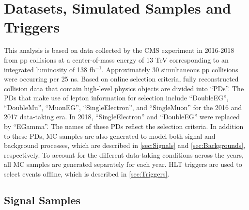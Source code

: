 \chapter{Datasets, Simulated Samples and Triggers}
\label{chap:Samples}

This analysis is based on data collected by the \ac{CMS} experiment in 2016-2018 from pp collisions at a center-of-mass energy of 13 TeV corresponding to an integrated luminosity of 138 fb$^{-1}$. Approximately 30 simultaneous pp collisions were occurring per 25 ns. Based on online selection criteria, fully reconstructed collision data that contain high-level physics objects are divided into ``\acp{PD}''. The \acp{PD} that make use of lepton information for selection include ``DoubleEG'', ``DoubleMu'', ``MuonEG'', ``SingleElectron'', and ``SingleMuon'' for the 2016 and 2017 data-taking era. In 2018, ``SingleElectron'' and ``DoubleEG'' were replaced by ``EGamma''. The names of these \acp{PD} reflect the selection criteria. In addition to these \acp{PD}, \ac{MC} samples are also generated to model both signal and background processes, which are described in \autoref{sec:Signals} and \autoref{sec:Backgrounds}, respectively. To account for the different data-taking conditions across the years, all \ac{MC} samples are generated separately for each year. \ac{HLT} triggers are used to select events offline, which is described in \autoref{sec:Triggers}.

\section{Signal Samples}
\label{sec:Signals}

